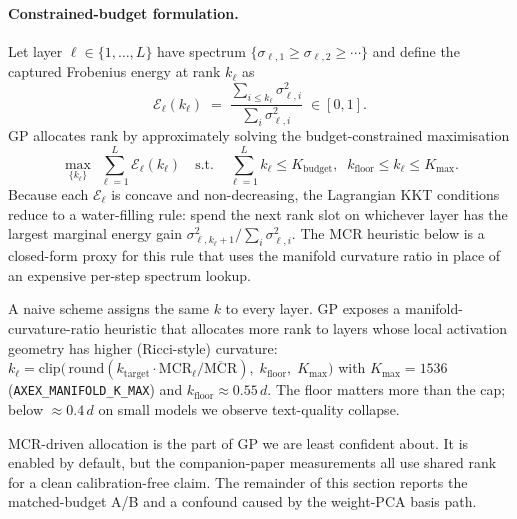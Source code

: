 \documentclass[11pt]{article}
\begin{document}
\paragraph{Constrained-budget formulation.}
Let layer $\ell\in\{1,\dots,L\}$ have spectrum
$\{\sigma_{\ell,1}\geq\sigma_{\ell,2}\geq\cdots\}$ and define the captured
Frobenius energy at rank $k_\ell$ as
\begin{equation}
\mathcal{E}_\ell(k_\ell)\;=\;\frac{\sum_{i\le k_\ell}\sigma_{\ell,i}^2}{\sum_i\sigma_{\ell,i}^2}\;\in[0,1].
\label{eq:Eell}
\end{equation}
GP allocates rank by approximately solving the budget-constrained
maximisation
\begin{equation}
\max_{\{k_\ell\}}\;\sum_{\ell=1}^{L}\mathcal{E}_\ell(k_\ell)
\quad\text{s.t.}\quad
\sum_{\ell=1}^{L}k_\ell\le K_\text{budget},\;\;
k_\text{floor}\le k_\ell\le K_\text{max}.
\label{eq:mcr}
\end{equation}
Because each $\mathcal{E}_\ell$ is concave and non-decreasing, the
Lagrangian KKT conditions reduce to a water-filling rule: spend the next
rank slot on whichever layer has the largest marginal energy gain
$\sigma_{\ell,k_\ell+1}^2 / \sum_i\sigma_{\ell,i}^2$.  The MCR heuristic
below is a closed-form proxy for this rule that uses the manifold
curvature ratio in place of an expensive per-step spectrum lookup.

A naive scheme assigns the same $k$ to every layer.  GP exposes a
manifold-curvature-ratio heuristic that allocates more rank to layers
whose local activation geometry has higher (Ricci-style) curvature:
$k_\ell = \mathrm{clip}\bigl(\,\mathrm{round}(k_\text{target}\cdot
\mathrm{MCR}_\ell/\overline{\mathrm{MCR}}),\;k_\text{floor},\;K_\text{max}\bigr)$
with $K_\text{max}{=}1536$ (\texttt{AXEX\_MANIFOLD\_K\_MAX}) and
$k_\text{floor}\approx 0.55\,d$.  The floor matters more than the cap; below
$\approx 0.4\,d$ on small models we observe text-quality collapse.

MCR-driven allocation is the part of GP we are least confident about.
It is enabled by default, but the companion-paper measurements all use
shared rank for a clean calibration-free claim. The remainder of this
section reports the matched-budget A/B and a confound caused by the
weight-PCA basis path.
\end{document}
